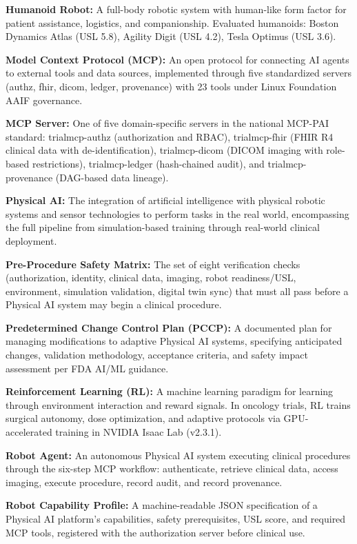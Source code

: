 \textbf{Humanoid Robot:} A full-body robotic system with human-like form factor for patient assistance, logistics, and companionship. Evaluated humanoids: Boston Dynamics Atlas (USL 5.8), Agility Digit (USL 4.2), Tesla Optimus (USL 3.6).

\textbf{Model Context Protocol (MCP):} An open protocol for connecting AI agents to external tools and data sources, implemented through five standardized servers (authz, fhir, dicom, ledger, provenance) with 23 tools under Linux Foundation AAIF governance.

\textbf{MCP Server:} One of five domain-specific servers in the national MCP-PAI standard: trialmcp-authz (authorization and RBAC), trialmcp-fhir (FHIR R4 clinical data with de-identification), trialmcp-dicom (DICOM imaging with role-based restrictions), trialmcp-ledger (hash-chained audit), and trialmcp-provenance (DAG-based data lineage).

\textbf{Physical AI:} The integration of artificial intelligence with physical robotic systems and sensor technologies to perform tasks in the real world, encompassing the full pipeline from simulation-based training through real-world clinical deployment.

\textbf{Pre-Procedure Safety Matrix:} The set of eight verification checks (authorization, identity, clinical data, imaging, robot readiness/USL, environment, simulation validation, digital twin sync) that must all pass before a Physical AI system may begin a clinical procedure.

\textbf{Predetermined Change Control Plan (PCCP):} A documented plan for managing modifications to adaptive Physical AI systems, specifying anticipated changes, validation methodology, acceptance criteria, and safety impact assessment per FDA AI/ML guidance.

\textbf{Reinforcement Learning (RL):} A machine learning paradigm for learning through environment interaction and reward signals. In oncology trials, RL trains surgical autonomy, dose optimization, and adaptive protocols via GPU-accelerated training in NVIDIA Isaac Lab (v2.3.1).

\textbf{Robot Agent:} An autonomous Physical AI system executing clinical procedures through the six-step MCP workflow: authenticate, retrieve clinical data, access imaging, execute procedure, record audit, and record provenance.

\textbf{Robot Capability Profile:} A machine-readable JSON specification of a Physical AI platform's capabilities, safety prerequisites, USL score, and required MCP tools, registered with the authorization server before clinical use.

